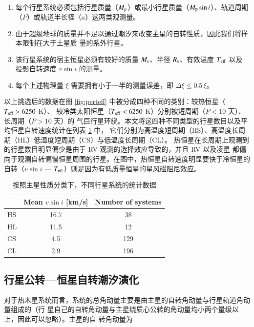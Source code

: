 \begin{enumerate}
\item 每个行星系统必须包括行星质量（$M_\mathrm{p}$）或最小行星质量（$M_\mathrm{p} \sin i$）、轨道周期
（$P$）或轨道半长径（$a$）这两类观测量。
\item 由于超级地球的质量并不足以通过潮汐来改变主星的自转性质，因此我们将样本限制在大于土星质
量的系外行星。
\item 该行星系统的宿主恒星必须有较好的质量 $M_\mathrm{s}$、半径 $R_\mathrm{s}$、有效温度 $T_\mathrm{eff}$ 以及
投影自转速度 $v \sin i$ 的测量。
\item 每个上述物理量 $\xi$ 需要拥有小于一半的测量误差，即 $\Delta \xi  \leq 0.5 \, \xi$。
\end{enumerate}

以上挑选后的数据在图 \ref{fig:perteff} 中被分成四种不同的类别：较热恒星（$T_\mathrm{eff} > 6250 $ K）、
较冷类太阳恒星（$T_\mathrm{eff} < 6250 $ K）分别被短周期（$P < 10 $ 天）、长周期（$P >10 $ 天）的
气巨行星环绕。本文将这四种不同类型的行星数目以及平均恒星自转速度统计在列表 \ref{tbl:stat} 中，
它们分别为高温度短周期（HS）、高温度长周期（HL）低温度短周期（CS）与低温度长周期（CL）。
热恒星在长周期上观测到的行星数目明显偏少是由于 RV 观测的选择效应导致的，并且 RV 以及凌星
都偏向于观测自转偏慢恒星周围的行星。在图中，热恒星自转速度明显要快于冷恒星的自转（$v\sin i$ 
--- $T_\mathrm{eff}$）则是因为有低质量恒星的星风磁阻尼效应\cite{Kraft1967}。

{\renewcommand{\arraystretch}{1.3}
\begin{table}[t]
\centering
\caption{按照主星性质分类下，不同行星系统的统计数据}
\label{tbl:stat}
\begin{tabularx}{0.9\textwidth}{@{\extracolsep{\fill}}lcc}
\toprule
  &  Mean $v \sin i $ [km/s]  & Number of systems \\ \midrule 
HS & 16.7       & 38                \\ 
HL & 11.5       & 12                 \\ 
CS & 4.5        & 129               \\ 
CL & 2.9        & 196                \\ \bottomrule
\end{tabularx}
\end{table}
}

\subsection{行星公转---恒星自转潮汐演化} \label{sec:obliquityevo}

对于热木星系统而言，系统的总角动量主要是由主星的自转角动量与行星轨道角动量组成的（行
星自己的自转角动量与主星绕质心公转的角动量均小两个量级以上，因此可以忽略）。主星的自
转角动量为

